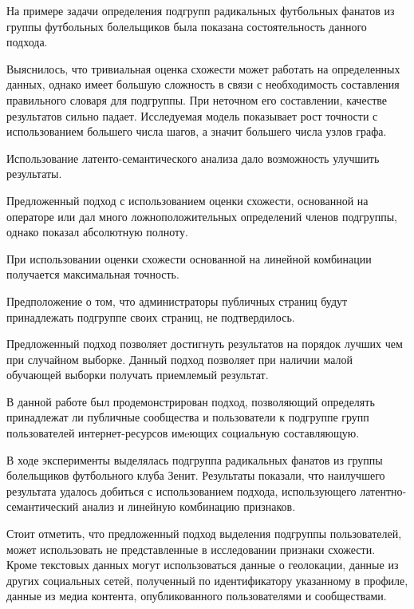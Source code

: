 \documentclass[annotation,times,page4]{itmo-student-thesis}
\begin{document}
На примере задачи определения подгрупп радикальных футбольных фанатов из группы футбольных болельщиков была показана состоятельность данного подхода. 

Выяснилось, что тривиальная оценка схожести может работать на определенных данных, однако имеет большую сложность в связи с необходимость составления правильного словаря для подгруппы. При неточном его составлении, качестве результатов сильно падает. Исследуемая модель показывает рост точности с использованием большего числа шагов, а значит большего числа узлов графа. 

Использование латенто-семантического анализа дало возможность улучшить результаты.

Предложенный подход с использованием оценки схожести, основанной на операторе или дал много ложноположительных определений членов подгруппы, однако показал абсолютную полноту.

При использовании оценки схожести основанной на линейной комбинации получается максимальная точность.

Предположение о том, что администраторы публичных страниц будут принадлежать подгруппе своих страниц, не подтвердилось. 

Предложенный подход позволяет достигнуть результатов на порядок лучших чем при случайном выборке.  
 Данный подход позволяет при наличии малой обучающей выборки получать приемлемый результат.



\startconclusionpage

В данной работе был продемонстрирован подход, позволяющий определять принадлежат ли публичные сообщества и пользователи к подгруппе групп пользователей интернет-ресурсов имeющих социальную составляющую.

В ходе эксперименты выделялась подгруппа радикальных фанатов из группы болельщиков футбольного клуба Зенит. Результаты показали, что наилучшего результата удалось добиться с использованием подхода, использующего латентно-семантический анализ и линейную комбинацию признаков.

Стоит отметить, что предложенный подход выделения подгруппы пользователей, может использовать не представленные в исследовании признаки схожести. Кроме текстовых данных могут использоваться данные о геолокации, данные из других социальных сетей, полученный по идентификатору указанному в профиле, данные из медиа контента, опубликованного пользователями и сообществами. 
\end{document}
